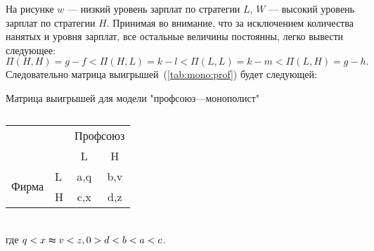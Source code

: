 На рисунке $w$ --- низкий уровень зарплат по стратегии $L$, $W$ --- высокий уровень зарплат по стратегии $H$. 
Принимая во внимание, что за исключением количества нанятых и уровня зарплат, все остальные величины постоянны,
легко вывести следующее:
\begin{equation}
\Pi(H,H)=g-f < \Pi(H,L)=k-l < \Pi(L, L)=k-m < \Pi(L,H)=g-h.
\end{equation}
\newpage
Следовательно матрица выигрышей~(\ref{tab:mono:prof}) будет следующей:
\begin{table}[h]
	
	\centering
	\caption{}
	 Матрица выигрышей для модели "профсоюз---монополист"\\
		\normalsize

\begin{tabular}{|l|l|c|c|}
	\hline
	\multicolumn{2}{|l|}{\multirow{2}{*}{}} & \multicolumn{2}{l|}{Профсоюз} \\ \cline{3-4} 
	\multicolumn{2}{|l|}{}                  & L                & H                \\ \hline
	\multirow{2}{*}{Фирма}    & L   & a,q              & b,v              \\ \cline{2-4} 
	& H   & c,x              & d,z              \\ \hline
\end{tabular}
	\label{table:firm}
\end{table}\\
где $q < x \thickapprox v < z, 0 > d < b < a < c$.
